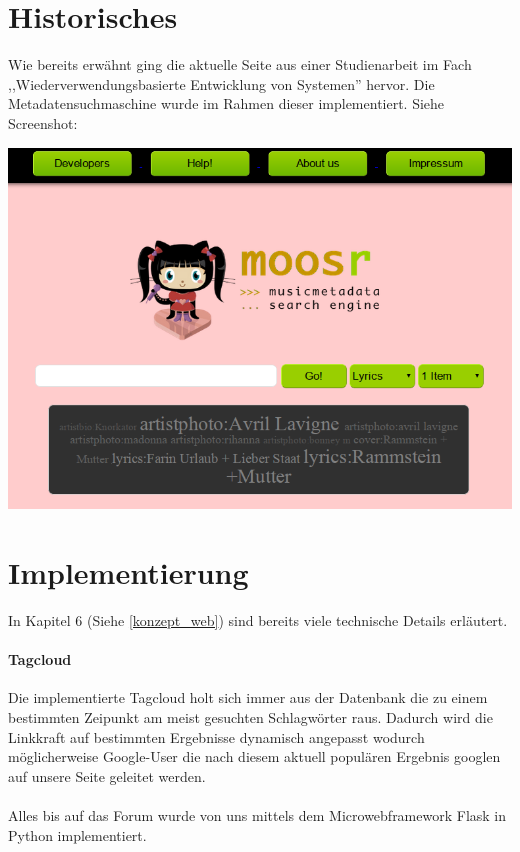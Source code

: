 \section{Historisches}

Wie bereits erwähnt ging die aktuelle Seite aus einer Studienarbeit im Fach 
,,Wiederverwendungsbasierte Entwicklung von Systemen'' hervor. Die
Metadatensuchmaschine wurde im Rahmen dieser implementiert. Siehe Screenshot:

\begin{center}
\includegraphics[scale=0.5]{../screenshots/old_site.png}
\end{center}


\section{Implementierung}

In Kapitel 6 (Siehe \ref{konzept_web}) sind bereits viele technische Details erläutert.

\paragraph{Tagcloud}
Die implementierte Tagcloud holt sich immer aus der Datenbank die zu einem
bestimmten Zeipunkt am meist gesuchten Schlagwörter raus. Dadurch wird die
Linkkraft auf bestimmten Ergebnisse dynamisch angepasst wodurch möglicherweise
Google-User die nach diesem aktuell populären Ergebnis googlen auf unsere Seite
geleitet werden.
\\
\\
Alles bis auf das Forum wurde von uns mittels dem Microwebframework Flask in
Python implementiert. 
